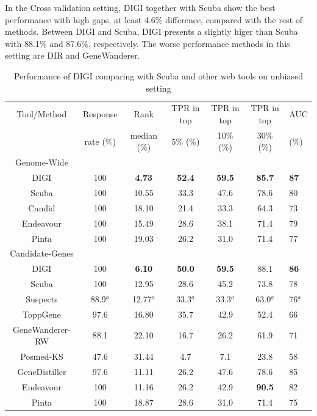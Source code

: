 In the Cross validation setting, DIGI together with Scuba show the best performance with high gaps, at least 4.6$\%$ difference, compared with the rest of methods. Between DIGI and Scuba, DIGI presents a slightly higer than Scuba with 88.1$\%$ and 87.6$\%$, respectively. The worse performance methods in this setting are DIR and GeneWanderer.

\begin{table}[!htb]
\caption{Performance of DIGI comparing with Scuba and other web tools on unbiased setting} 
\label{tab:unbiased_evalutation}
\setlength\tabcolsep{0pt} %

\centering
\smallskip 
\begin{tabular*}{\textwidth}{@{\extracolsep{\fill}}ccccccl}
\hline
  Tool/Method & Response & Rank & TPR in top & TPR in top & TPR in top & AUC\\
              & rate (\%)    & median (\%) & 5\% (\%) & 10\% (\%) & 30\% (\%) & (\%)\\
\hline
Genome-Wide \\  
  DIGI & 100 & \textbf{4.73} & \textbf{52.4} & \textbf{59.5} & \textbf{85.7} & \textbf{87} \\
  Scuba & 100 & 10.55  &  33.3 & 47.6 & 78.6 & 80 \\
  Candid & 100 &  18.10 & 21.4 & 33.3 & 64.3 & 73 \\
  Endeavour & 100 &  15.49 & 28.6 & 38.1 & 71.4 & 79 \\  
  Pinta & 100 & 19.03 & 26.2 & 31.0 & 71.4 & 77 \\
  \hline
  Candidate-Genes \\
  DIGI & 100 & \textbf{6.10} & \textbf{50.0} & \textbf{59.5} & 88.1 & \textbf{86} \\ 
  Scuba & 100 &  12.95  &  28.6 & 45.2 & 73.8 & 78 \\
  Suspects & 88.9$^a$ &  12.77$^a$ & 33.3$^a$ & 33.3$^a$ & 63.0$^a$ & 76$^a$ \\
  ToppGene & 97.6 &  16.80 & 35.7 & 42.9 & 52.4 & 66 \\  
  GeneWanderer-RW & 88.1 &  22.10 & 16.7 & 26.2 & 61.9 & 71 \\
  Posmed-KS & 47.6 &  31.44 & 4.7 & 7.1 & 23.8 & 58 \\
  GeneDistiller & 97.6 &  11.11 & 26.2 & 47.6 & 78.6 & 85\\  
  Endeavour & 100 &  11.16 & 26.2 & 42.9 & \textbf{90.5} & 82 \\
  Pinta & 100 & 18.87 & 28.6 & 31.0 & 71.4 & 75 \\  
\hline
\end{tabular*}
\end{table}

